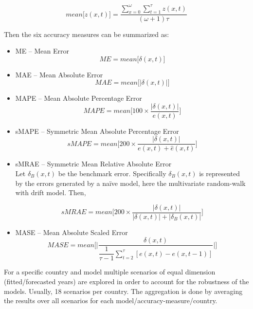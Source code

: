 \documentclass[T0_MEM]{subfiles}
\begin{document}
\begin{equation}
mean\Big[z(x,t)\Big] = \dfrac{\sum_{x=0}^{\omega} \sum_{t=1}^{\tau} z(x,t)}{(\omega + 1)\tau}
\end{equation}

Then the six accuracy measures can be summarized as:

\begin{itemize}
  \item ME -- Mean Error
  \begin{equation}
    ME = mean\Big[\delta(x,t)\Big]
  \end{equation}

  \item MAE -- Mean Absolute Error
  \begin{equation}
  MAE = mean\Big[|\delta(x,t)|\Big]
  \end{equation}

  \item MAPE -- Mean Absolute Percentage Error
  \begin{equation}
  MAPE = mean\Big[ 100 \times \dfrac{|\delta(x,t)|}{e(x,t)} \Big]
  \end{equation}

  \item sMAPE -- Symmetric Mean Absolute Percentage Error
  \begin{equation}
  sMAPE = mean\Big[ 200 \times \dfrac{|\delta(x,t)|}{e(x,t) + \hat{e}(x,t)} \Big]
  \end{equation}

  \item sMRAE -- Symmetric Mean Relative Absolute Error\\
  Let $\delta_B(x,t)$ be the benchmark error. Specifically $\delta_B(x,t)$ is represented by the errors generated by a na\"ive model, here the multivariate random-walk with drift model. Then,

  \begin{equation}
  sMRAE = mean\Big[ 200 \times \dfrac{|\delta(x,t)|}{|\delta(x,t)| + |\delta_B(x,t)|} \Big]
  \end{equation}

  \item MASE -- Mean Absolute Scaled Error
  \begin{equation}
  MASE = mean\Bigg[\Bigg| \dfrac{\delta(x,t)}{ \dfrac{1}{\tau - 1} \sum_{t=2}^{\tau} [e(x,t) - e(x,t-1)] } \Bigg|\Bigg]
  \end{equation}
\end{itemize}


For a specific country and model multiple scenarios of equal dimension (fitted/forecasted years) are explored in order to account for the robustness of the models. Usually, 18 scenarios per country. The aggregation is done by averaging the results over all scenarios for each model/accuracy-measure/country.
\end{document}
